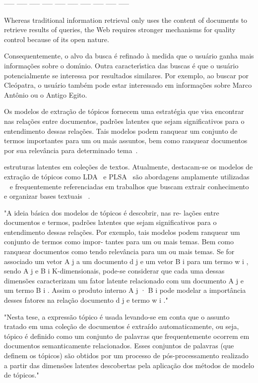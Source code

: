 ----- ----- ----- ----- ----- ----- ----- ----- ----- ----- 





Whereas traditional information retrieval only uses the content of documents to
retrieve results of queries, the Web requires stronger mechanisms for quality control because
of its open nature.



Consequentemente, o alvo da busca é refinado à medida que o usuário ganha mais informações sobre o domı́nio. Outra caracterı́stica das buscas é que o usuário potencialmente se interessa por resultados similares. Por exemplo, ao buscar por Cleópatra, o usuário também pode estar interessado em informações sobre Marco Antônio ou o Antigo Egito.




Os modelos de extração de tópicos fornecem uma estratégia que visa encontrar nas relações entre documentos, padrões latentes que sejam significativos para o entendimento dessas relações. Tais modelos podem ranquear um conjunto de termos importantes para um ou mais assuntos, bem como ranquear documentos por sua relevância para determinado tema~\cite{Faleiros}.


estruturas latentes em coleções de textos. Atualmente, destacam-se os modelos de extração de tópicos como LDA~\cite{Blei2003} e PLSA~\cite{Hofmann1999} são abordagens amplamente utilizadas ~\cite{DZhu20122} e frequentemente referenciadas em trabalhos que buscam extrair conhecimento e organizar bases textuais ~\cite{Steyvers2007, OCallaghan2015}. 

"A ideia básica dos modelos de tópicos é descobrir, nas re- lações entre documentos e termos, padrões latentes que sejam significativos para o entendimento dessas relações. Por exemplo, tais modelos podem ranquear um conjunto de termos como impor- tantes para um ou mais temas. Bem como ranquear documentos como tendo relevância para um ou mais temas. Se for associado um vetor A j a um documento d j e um vetor B i para um termo w i , sendo A j e B i K-dimensionais, pode-se considerar que cada uma dessas dimensões caracterizam um fator latente relacionado com um documento A j e um termo B i . Assim o produto interno A j · B i pode modelar a importância desses fatores na relação documento d j e termo w i ."




"Nesta tese, a expressão tópico é usada levando-se em conta que o assunto tratado em uma coleção de documentos é extraído automaticamente, ou seja, tópico é definido como um conjunto de palavras que frequentemente ocorrem em documentos semanticamente relacionados. Esses conjuntos de palavras (que definem os tópicos) são obtidos por um processo de pós-processamento realizado a partir das dimensões latentes descobertas pela aplicação dos métodos de modelo de tópicos."  



